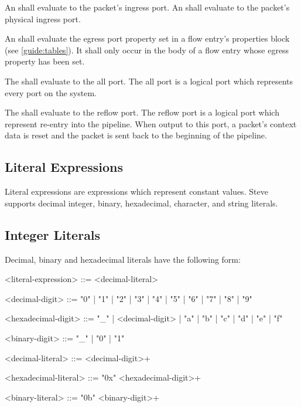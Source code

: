 An  shall evaluate to the packet's ingress port.
An  shall evaluate to the packet's physical ingress port.

An  shall evaluate the egress port property set in a flow entry's properties block (see \ref{guide:tables}). It shall only occur in the body of a flow entry whose egress property has been set.

The  shall evaluate to the all port. The all port is a logical port which represents every port on the system.

The  shall evaluate to the reflow port. The reflow port is a logical port which represent re-entry into the pipeline. When output to this port, a packet's context data is reset and the packet is sent back to the beginning of the pipeline.

\subsection{Literal Expressions} \label{guide:literal_expr}

Literal expressions are expressions which represent constant values. Steve supports decimal integer, binary, hexadecimal, character, and string literals.

\subsection{Integer Literals}

Decimal, binary and hexadecimal literals have the following form:

\begin{minip}
\begin{grammar}
<literal-expression> ::=
<decimal-literal>

<decimal-digit> ::= "0" | "1" | "2" | "3" | "4" | "5" | "6" | "7" | "8" | "9"

<hexadecimal-digit> ::= "_" | <decimal-digit> | "a" | "b" | "c" | "d" | "e" | "f"            

<binary-digit> ::= "_" | "0" | "1"

<decimal-literal> ::=
<decimal-digit>+

<hexadecimal-literal> ::=
"0x" <hexadecimal-digit>+

<binary-literal> ::=
"0b" <binary-digit>+
\end{grammar}
\end{minip}

